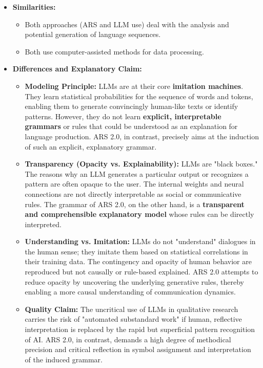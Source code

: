 \documentclass{article}
\begin{document}
\begin{itemize}
    \item \textbf{Similarities:}
    \begin{itemize}
        \item Both approaches (ARS and LLM use) deal with the analysis and potential generation of language sequences.
        \item Both use computer-assisted methods for data processing.
    \end{itemize}
    \item \textbf{Differences and Explanatory Claim:}
    \begin{itemize}
        \item \textbf{Modeling Principle:} LLMs are at their core \textbf{imitation machines}. They learn statistical probabilities for the sequence of words and tokens, enabling them to generate convincingly human-like texts or identify patterns. However, they do not learn \textbf{explicit, interpretable grammars} or rules that could be understood as an explanation for language production. ARS 2.0, in contrast, precisely aims at the induction of such an explicit, explanatory grammar.
        \item \textbf{Transparency (Opacity vs. Explainability):} LLMs are "black boxes." The reasons why an LLM generates a particular output or recognizes a pattern are often opaque to the user. The internal weights and neural connections are not directly interpretable as social or communicative rules. The grammar of ARS 2.0, on the other hand, is a \textbf{transparent and comprehensible explanatory model} whose rules can be directly interpreted.
        \item \textbf{Understanding vs. Imitation:} LLMs do not "understand" dialogues in the human sense; they imitate them based on statistical correlations in their training data. The contingency and opacity of human behavior are reproduced but not causally or rule-based explained. ARS 2.0 attempts to reduce opacity by uncovering the underlying generative rules, thereby enabling a more causal understanding of communication dynamics.
        \item \textbf{Quality Claim:} The uncritical use of LLMs in qualitative research carries the risk of "automated substandard work" if human, reflective interpretation is replaced by the rapid but superficial pattern recognition of AI. ARS 2.0, in contrast, demands a high degree of methodical precision and critical reflection in symbol assignment and interpretation of the induced grammar.
    \end{itemize}
\end{itemize}
\end{document}
